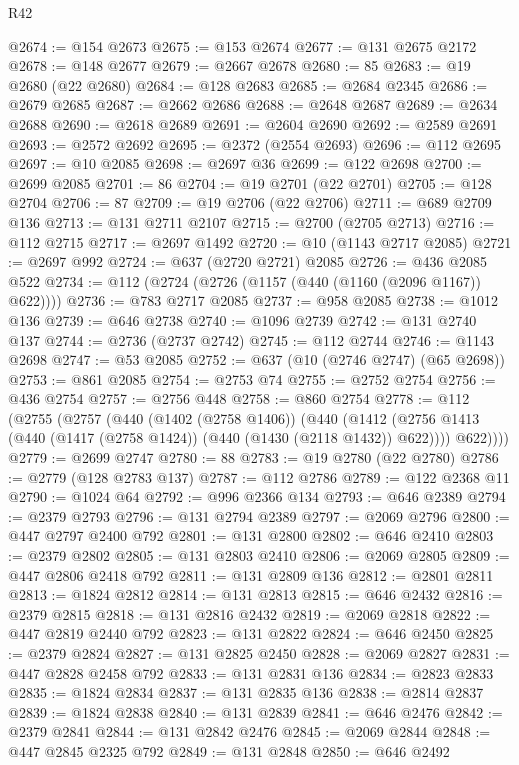 \begin{lexlean}{R42}
\begin{coremodule}
@2674 := @154 @2673
@2675 := @153 @2674
@2677 := @131 @2675 @2172
@2678 := @148 @2677
@2679 := @2667 @2678
@2680 := 85
@2683 := @19 @2680 (@22 @2680)
@2684 := @128 @2683
@2685 := @2684 @2345
@2686 := @2679 @2685
@2687 := @2662 @2686
@2688 := @2648 @2687
@2689 := @2634 @2688
@2690 := @2618 @2689
@2691 := @2604 @2690
@2692 := @2589 @2691
@2693 := @2572 @2692
@2695 := @2372 (@2554 @2693)
@2696 := @112 @2695
@2697 := @10 @2085
@2698 := @2697 @36
@2699 := @122 @2698
@2700 := @2699 @2085
@2701 := 86
@2704 := @19 @2701 (@22 @2701)
@2705 := @128 @2704
@2706 := 87
@2709 := @19 @2706 (@22 @2706)
@2711 := @689 @2709 @136
@2713 := @131 @2711 @2107
@2715 := @2700 (@2705 @2713)
@2716 := @112 @2715
@2717 := @2697 @1492
@2720 := @10 (@1143 @2717 @2085)
@2721 := @2697 @992
@2724 := @637 (@2720 @2721) @2085
@2726 := @436 @2085 @522
@2734 := @112 (@2724 (@2726 (@1157 (@440 (@1160 (@2096 @1167)) @622))))
@2736 := @783 @2717 @2085
@2737 := @958 @2085
@2738 := @1012 @136
@2739 := @646 @2738
@2740 := @1096 @2739
@2742 := @131 @2740 @137
@2744 := @2736 (@2737 @2742)
@2745 := @112 @2744
@2746 := @1143 @2698
@2747 := @53 @2085
@2752 := @637 (@10 (@2746 @2747) (@65 @2698))
@2753 := @861 @2085
@2754 := @2753 @74
@2755 := @2752 @2754
@2756 := @436 @2754
@2757 := @2756 @448
@2758 := @860 @2754
@2778 := @112
    (@2755
      (@2757
        (@440
          (@1402 (@2758 @1406))
          (@440
            (@1412 (@2756 @1413 (@440 (@1417 (@2758 @1424)) (@440 (@1430 (@2118 @1432)) @622))))
            @622))))
@2779 := @2699 @2747
@2780 := 88
@2783 := @19 @2780 (@22 @2780)
@2786 := @2779 (@128 @2783 @137)
@2787 := @112 @2786
@2789 := @122 @2368 @11
@2790 := @1024 @64
@2792 := @996 @2366 @134
@2793 := @646 @2389
@2794 := @2379 @2793
@2796 := @131 @2794 @2389
@2797 := @2069 @2796
@2800 := @447 @2797 @2400 @792
@2801 := @131 @2800
@2802 := @646 @2410
@2803 := @2379 @2802
@2805 := @131 @2803 @2410
@2806 := @2069 @2805
@2809 := @447 @2806 @2418 @792
@2811 := @131 @2809 @136
@2812 := @2801 @2811
@2813 := @1824 @2812
@2814 := @131 @2813
@2815 := @646 @2432
@2816 := @2379 @2815
@2818 := @131 @2816 @2432
@2819 := @2069 @2818
@2822 := @447 @2819 @2440 @792
@2823 := @131 @2822
@2824 := @646 @2450
@2825 := @2379 @2824
@2827 := @131 @2825 @2450
@2828 := @2069 @2827
@2831 := @447 @2828 @2458 @792
@2833 := @131 @2831 @136
@2834 := @2823 @2833
@2835 := @1824 @2834
@2837 := @131 @2835 @136
@2838 := @2814 @2837
@2839 := @1824 @2838
@2840 := @131 @2839
@2841 := @646 @2476
@2842 := @2379 @2841
@2844 := @131 @2842 @2476
@2845 := @2069 @2844
@2848 := @447 @2845 @2325 @792
@2849 := @131 @2848
@2850 := @646 @2492

\end{coremodule}
\end{lexlean}
